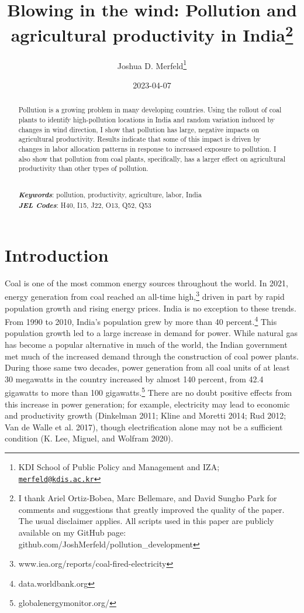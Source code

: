 \documentclass[
]{article}
\title{Blowing in the wind: Pollution and agricultural productivity in India\footnote{I thank Ariel Ortiz-Bobea, Marc Bellemare, and David Sungho Park for comments and suggestions that greatly improved the quality of the paper. The usual disclaimer applies. All scripts used in this paper are publicly available on my GitHub page: github.com/JoshMerfeld/pollution\_development}}
\author{Joshua D. Merfeld\footnote{KDI School of Public Policy and Management and IZA; \href{mailto:merfeld@kdis.ac.kr}{\nolinkurl{merfeld@kdis.ac.kr}}}}
\date{2023-04-07}
\begin{document}
\maketitle
\begin{abstract}
\noindent Pollution is a growing problem in many developing countries. Using the rollout of coal plants to identify high-pollution locations in India and random variation induced by changes in wind direction, I show that pollution has large, negative impacts on agricultural productivity. Results indicate that some of this impact is driven by changes in labor allocation patterns in response to increased exposure to pollution. I also show that pollution from coal plants, specifically, has a larger effect on agricultural productivity than other types of pollution.\\
\strut \\
\textbf{\textit{Keywords}}: pollution, productivity, agriculture, labor, India\\
\textbf{\textit{JEL Codes}}: H40, I15, J22, O13, Q52, Q53
\end{abstract}

\newpage
\doublespacing

\hypertarget{introduction}{%
\section{Introduction}\label{introduction}}

Coal is one of the most common energy sources throughout the world. In 2021, energy generation from coal reached an all-time high,\footnote{www.iea.org/reports/coal-fired-electricity} driven in part by rapid population growth and rising energy prices. India is no exception to these trends. From 1990 to 2010, India's population grew by more than 40 percent.\footnote{data.worldbank.org} This population growth led to a large increase in demand for power. While natural gas has become a popular alternative in much of the world, the Indian government met much of the increased demand through the construction of coal power plants. During those same two decades, power generation from all coal units of at least 30 megawatts in the country increased by almost 140 percent, from 42.4 gigawatts to more than 100 gigawatts.\footnote{globalenergymonitor.org/} There are no doubt positive effects from this increase in power generation; for example, electricity may lead to economic and productivity growth (Dinkelman 2011; Kline and Moretti 2014; Rud 2012; Van de Walle et al. 2017), though electrification alone may not be a sufficient condition (K. Lee, Miguel, and Wolfram 2020).
\end{document}
